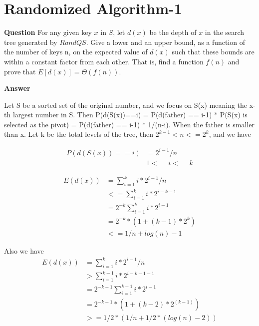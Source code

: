 \documentclass[12pt]{article}
\begin{document}
\section{Randomized Algorithm-1}
\textbf{Question}
For any given key $x$ in $S$, let $d(x)$ be the depth of $x$ in the search tree generated by $RandQS$. Give a lower and an upper bound, as a function of the number of keys n, on the expected value of $d(x)$ such that these bounds are within a constant factor from each other. That is, find a function $f(n)$ and prove that $E[d(x)]=\Theta(f(n))$.

\textbf{Answer}



Let S be a sorted set of the original number, and we focus on S(x) meaning the x-th largest number in S. Then P(d(S(x))==i) = P(d(father) == i-1) * P(S(x) is selected as the pivot) = P(d(father) == i-1) * 1/(n-i). When the father is smaller than x. Let k be the total levels of the tree, then $2^{k-1} < n <=2^{k}$, and we have

\begin{equation}
\begin{aligned}
P(d(S(x))==i) &= 2^{i-1}/n\\
&1<=i <= k
\end{aligned}
\end{equation}

\begin{equation}
\begin{aligned}
E(d(x)) &= \sum_{i=1}^{k}  i*2^{i-1}/n\\
&<=\sum_{i=1}^{k}  i*2^{i-k-1}\\
&=2^{-k}\sum_{i=1}^{k}i*2^{i-1}\\
&=2^{-k}*(1+(k-1)*2^k)\\
&<=1/n + log(n) - 1
\end{aligned}
\end{equation}

Also we have
\begin{equation}
\begin{aligned}
E(d(x)) &= \sum_{i=1}^{k}  i*2^{i-1}/n\\
&>\sum_{i=1}^{k-1}  i*2^{i-k-1-1}\\
&=2^{-k-1}\sum_{i=1}^{k-1}i*2^{i-1}\\
&=2^{-k-1}*(1+(k-2)*2^(k-1))\\
&>=1/2*(1/n + 1/2*(log(n)-2))
\end{aligned}
\end{equation}
\end{document}
